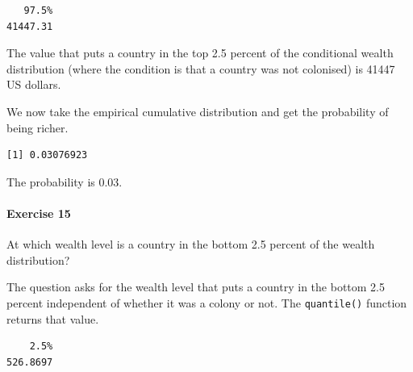 \documentclass[]{article}
\newenvironment{Shaded}{\begin{snugshade}}{\end{snugshade}}
\newcommand{\KeywordTok}[1]{\textcolor[rgb]{0.13,0.29,0.53}{\textbf{#1}}}
\newcommand{\DecValTok}[1]{\textcolor[rgb]{0.00,0.00,0.81}{#1}}
\newcommand{\StringTok}[1]{\textcolor[rgb]{0.31,0.60,0.02}{#1}}
\newcommand{\CommentTok}[1]{\textcolor[rgb]{0.56,0.35,0.01}{\textit{#1}}}
\newcommand{\OperatorTok}[1]{\textcolor[rgb]{0.81,0.36,0.00}{\textbf{#1}}}
\newcommand{\NormalTok}[1]{#1}
\let\oldparagraph\paragraph
\renewcommand{\paragraph}[1]{\oldparagraph{#1}\mbox{}}
\theoremstyle{definition}
\theoremstyle{definition}
\theoremstyle{definition}
\theoremstyle{remark}
\begin{document}
\begin{verbatim}
   97.5% 
41447.31 
\end{verbatim}

The value that puts a country in the top 2.5 percent of the conditional
wealth distribution (where the condition is that a country was not
colonised) is 41447 US dollars.

We now take the empirical cumulative distribution and get the
probability of being richer.

\begin{Shaded}
\end{Shaded}

\begin{verbatim}
[1] 0.03076923
\end{verbatim}

The probability is 0.03.

\paragraph{Exercise 15}\label{exercise-15}

At which wealth level is a country in the bottom 2.5 percent of the
wealth distribution?

The question asks for the wealth level that puts a country in the bottom
2.5 percent independent of whether it was a colony or not. The
\texttt{quantile()} function returns that value.

\begin{Shaded}
\end{Shaded}

\begin{verbatim}
    2.5% 
526.8697 
\end{verbatim}
\end{document}
